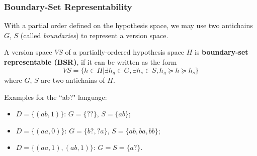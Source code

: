\documentclass[]{beamer}
\begin{document}
\begin{frame}
\begin{itemize}
\begin{figure}[h]
		
	\end{figure}
	
	\end{itemize}

\end{frame}

\begin{frame}
\frametitle{Boundary-Set Representability}
With a partial order defined on the hypothesis space, we may use two antichains $G$, $S$ (called \textit{boundaries}) to represent a version space.

\begin{definition}
	A version space $VS$ of a partially-ordered hypothesis space $H$ is \textbf{boundary-set representable (BSR)}, if it can be written as the form
	$$
	VS = \{h \in H | \exists h_g \in G, \exists h_s \in S, h_g \succeq h \succeq h_s \}
	$$
	where $G$, $S$ are two antichains of $H$.
\end{definition}

\pause

Examples for the ``ab?" language: 
\begin{itemize}
	\item $D = \{(ab, 1)\}$: $G = \{??\}$, $S = \{ab\}$;
	\item $D = \{(aa, 0)\}$: $G = \{b?, ?a\}$, $S = \{ab, ba, bb\}$;
	\item $D = \{(aa, 1), (ab, 1)\}$: $G = S = \{a?\}$.
\end{itemize}

\end{frame}
\end{document}
